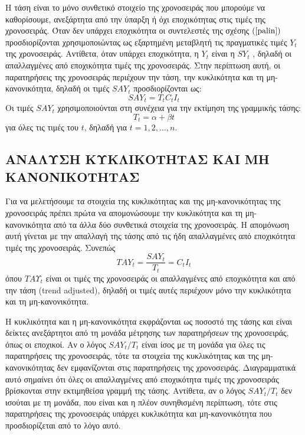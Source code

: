 Η τάση είναι το μόνο συνθετικό στοιχείο της χρονοσειράς που μπορούμε να
καθορίσουμε, ανεξάρτητα από την ύπαρξη ή όχι εποχικότητας στις τιμές της
χρονοσειράς. Όταν δεν υπάρχει εποχικότητα οι συντελεστές της σχέσης $\left(\ref{palin}\right)$
προσδιορίζονται χρησιμοποιώντας ως εξαρτημένη μεταβλητή τις πραγματικές τιμές
$Y_t$ της χρονοσειράς. Αντίθετα, όταν υπάρχει εποχικότητα, η $Y_t$ είναι η $SY_t$ , δηλαδή
οι απαλλαγμένες από εποχικότητα τιμές της χρονοσειράς. Στην περίπτωση αυτή, οι
παρατηρήσεις της χρονοσειράς περιέχουν την τάση, την κυκλικότητα και τη μη-
κανονικότητα, δηλαδή οι τιμές $SAY_t$ προσδιορίζονται ως:\\
$$ SAY_t=T_tC_tI_t $$
Οι τιμές $SAY_t$ χρησιμοποιούνται στη συνέχεια για την εκτίμηση της γραμμικής
τάσης:\\
$$ T_t=\alpha + \beta t $$
για όλες τις τιμές του $t$, δηλαδή για $t = 1, 2,\ldots, n$.
\subsection{ΑΝΑΛΥΣΗ ΚΥΚΛΙΚΟΤΗΤΑΣ ΚΑΙ ΜΗ ΚΑΝΟΝΙΚΟΤΗΤΑΣ}
Για να μελετήσουμε τα στοιχεία της κυκλικότητας και της μη-κανονικότητας της
χρονοσειράς πρέπει πρώτα να απομονώσουμε την κυκλικότητα και τη μη-
κανονικότητα από τα άλλα δύο συνθετικά στοιχεία της χρονοσειράς. Η απομόνωση
αυτή γίνεται με την απαλλαγή της τάσης από τις ήδη απαλλαγμένες από εποχικότητα
τιμές της χρονοσειράς. Συνεπώς\\
$$ TAY_t=\frac{SAY_t}{T_t}=C_tI_t $$
όπου $TAΥ_t$ είναι οι τιμές της χρονοσειράς οι απαλλαγμένες από εποχικότητα και από
την τάση (trend adjusted), δηλαδή οι τιμές αυτές περιέχουν μόνο την κυκλικότητα και
τη μη-κανονικότητα.

Η κυκλικότητα και η μη-κανονικότητα εκφράζονται ως ποσοστό της τάσης και
είναι δείκτες ανεξάρτητοι από τη μονάδα μέτρησης των παρατηρήσεων της
χρονοσειράς, όπως οι εποχικοί. Αν ο λόγος $SAY_t/ T_t$ είναι ίσος με τη μονάδα για
όλες τις παρατηρήσεις της χρονοσειράς, τότε τα στοιχεία της κυκλικότητας και της
μη-κανονικότητας δεν εμφανίζονται στις παρατηρήσεις της χρονοσειράς.
Διαγραμματικά αυτό σημαίνει ότι όλες οι απαλλαγμένες από εποχικότητα τιμές της
χρονοσειράς βρίσκονται στην εκτιμηθείσα γραμμή της τάσης. Αντίθετα, αν ο λόγος
$SAY_t/ T_t$ δεν ισούται με τη μονάδα, που είναι και η πλέον συνηθισμένη περίπτωση,
τότε στις παρατηρήσεις της χρονοσειράς υπάρχει κυκλικότητα και μη-κανονικότητα
που προσδιορίζεται από το λόγο αυτό.


